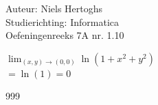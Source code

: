 \documentclass[a4paper]{article}
\begin{document}
	
\noindent \large Auteur: Niels Hertoghs \\
\noindent \large Studierichting: Informatica\\
\noindent \large Oefeningenreeks 7A nr. 1.10\\

\medskip

\normalsize

$\lim_{(x,y) \rightarrow (0,0)} \ln (1 + x^2 + y^2)$\\

$ = \ln (1) = 0$\\

\begin{thebibliography}{999}
	
\end{thebibliography}
\end{document}
